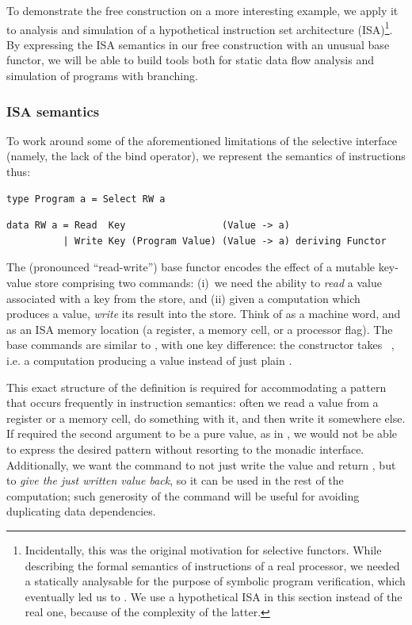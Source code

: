 To demonstrate the free construction on a more interesting example, we apply it
to analysis and simulation of a hypothetical instruction set architecture
(ISA)\footnote{Incidentally, this was the original motivation for selective
functors. While describing the formal semantics of instructions of a real
processor, we needed a statically analysable  for the purpose of
symbolic program verification, which eventually led us to . We use a
hypothetical ISA in this section instead of the real one, because of the
complexity of the latter.}. By expressing the ISA semantics in our
free construction with an unusual base functor, we will be able to build
tools both for static data flow analysis and simulation of programs with
branching.

\subsubsection{ISA semantics}

To work around some of the aforementioned limitations of the selective
interface (namely, the lack of the bind operator), we represent the semantics of
instructions thus:

\vspace{1mm}
\begin{verbatim}
type Program a = Select RW a
\end{verbatim}
\vspace{1mm}
\begin{verbatim}
data RW a = Read  Key                 (Value -> a)
          | Write Key (Program Value) (Value -> a) deriving Functor
\end{verbatim}
\vspace{1mm}

\noindent
The  (pronounced ``read-write'') base functor encodes the effect of a
mutable key-value store comprising two commands: (i)~we need the ability to
\emph{read} a value associated with a key from the store, and (ii) given a
computation which produces a value, \emph{write} its result into the store.
Think of  as a machine word, and  as an ISA memory location
(a register, a memory cell, or a processor flag). The base commands are similar
to , with one key difference: the  constructor takes
~, i.e. a computation producing a value instead of just
plain .

This exact structure of the definition is required for accommodating a pattern
that occurs frequently in instruction semantics: often we read a value from a
register or a memory cell, do something with it, and then write it somewhere
else. If  required the second argument to be a pure value, as in
, we would not be able to express the desired pattern without
resorting to the monadic interface. Additionally, we want the 
command to not just write the value and return \hs{()}, but to \emph{give the
just written value back}, so it can be used in the rest of the computation; such
generosity of the  command will be useful for avoiding duplicating
data dependencies.

